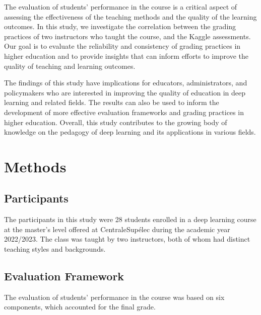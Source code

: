 \documentclass[a4paper]{article}
\begin{document}
	The evaluation of students' performance in the course is a critical aspect of assessing the effectiveness of the teaching methods and the quality of the learning outcomes.
	In this study, we investigate the correlation between the grading practices of two instructors who taught the course, and the Kaggle assessments.
	Our goal is to evaluate the reliability and consistency of grading practices in higher education and to provide insights that can inform efforts to improve the quality of teaching and learning outcomes.
	
	The findings of this study have implications for educators, administrators, and policymakers who are interested in improving the quality of education in deep learning and related fields.
	The results can also be used to inform the development of more effective evaluation frameworks and grading practices in higher education.
	Overall, this study contributes to the growing body of knowledge on the pedagogy of deep learning and its applications in various fields.
	
	
	
	\section{Methods}
	\subsection{Participants}
	The participants in this study were 28 students enrolled in a deep learning course at the master's level offered at CentraleSupélec during the academic year 2022/2023.
	The class was taught by two instructors, both of whom had distinct teaching styles and backgrounds.
	
	\subsection{Evaluation Framework}
	The evaluation of students' performance in the course was based on six components, which accounted for the final grade.
	
\end{document}

